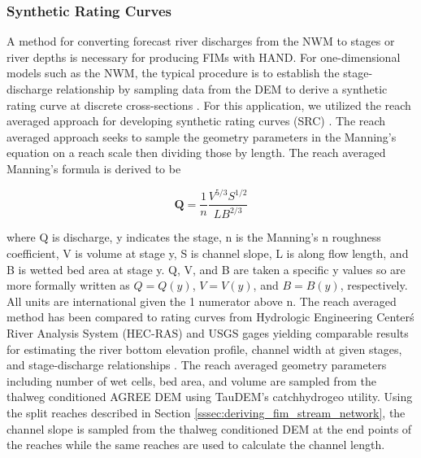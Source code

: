 \documentclass[draft]{dependencies/agujournal2019}
\begin{document}
\subsubsection{Synthetic Rating Curves}
\label{sssec:synthetic_rating_curve}
%
 A method for converting forecast river discharges from the NWM to stages or river depths is necessary for producing FIMs with HAND. 
For one-dimensional models such as the NWM, the typical procedure is to establish the stage-discharge relationship by sampling data from the DEM to derive a synthetic rating curve at discrete cross-sections \cite{quintero2021development,di2011hydraulic}. 
For this application, we utilized the reach averaged approach for developing synthetic rating curves (SRC) \cite{zheng2018river}.
The reach averaged approach seeks to sample the geometry parameters in the Manning's equation \cite{gauckler1867etudes,manning1890flow} on a reach scale then dividing those by length. 
The reach averaged Manning's formula is derived to be 
%
\begin{linenomath*}
\begin{equation}
\label{eq:reach_averaged_mannings_equation}
\textbf{Q} = \frac{1}{n} \frac{V^{5/3}S^{1/2}}{L B^{2/3}} 
\end{equation}
\end{linenomath*}
%
where Q is discharge, y indicates the stage, n is the Manning's n roughness coefficient, V is volume at stage y, S is channel slope, L is along flow length, and B is wetted bed area at stage y.
Q, V, and B are taken a specific y values so are more formally written as $Q = Q(y)$, $V = V(y)$, and $B = B(y)$, respectively.
All units are international given the 1 numerator above n.
The reach averaged method has been compared to rating curves from Hydrologic Engineering Center\'s River Analysis System (HEC-RAS) and USGS gages yielding comparable results for estimating the river bottom elevation profile, channel width at given stages, and stage-discharge relationships \cite{zheng2018river}.
The reach averaged geometry parameters including number of wet cells, bed area, and volume are sampled from the thalweg conditioned AGREE DEM using TauDEM's catchhydrogeo utility.
Using the split reaches described in Section \ref{sssec:deriving_fim_stream_network}, the channel slope is sampled from the thalweg conditioned DEM at the end points of the reaches while the same reaches are used to calculate the channel length.
\end{document}
